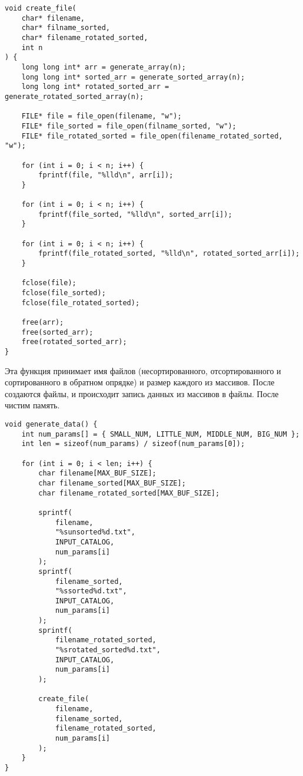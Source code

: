 \documentclass[a4paper,12pt,titlepage,finall]{article}
\begin{document}
\begin{verbatim}
void create_file(
    char* filename,
    char* filname_sorted,
    char* filename_rotated_sorted,
    int n
) {
    long long int* arr = generate_array(n);
    long long int* sorted_arr = generate_sorted_array(n);
    long long int* rotated_sorted_arr = generate_rotated_sorted_array(n);

    FILE* file = file_open(filename, "w");
    FILE* file_sorted = file_open(filname_sorted, "w");
    FILE* file_rotated_sorted = file_open(filename_rotated_sorted, "w");

    for (int i = 0; i < n; i++) {
        fprintf(file, "%lld\n", arr[i]);
    }

    for (int i = 0; i < n; i++) {
        fprintf(file_sorted, "%lld\n", sorted_arr[i]);
    }

    for (int i = 0; i < n; i++) {
        fprintf(file_rotated_sorted, "%lld\n", rotated_sorted_arr[i]);
    }

    fclose(file);
    fclose(file_sorted);
    fclose(file_rotated_sorted);

    free(arr);
    free(sorted_arr);
    free(rotated_sorted_arr);
}
\end{verbatim}

Эта функция принимает имя файлов (несортированного, отсортированного и сортированного в обратном опрядке) и размер каждого из массивов.
После создаются файлы, и происходит запись данных из массивов в файлы. После чистим память.

\begin{verbatim}
void generate_data() {
    int num_params[] = { SMALL_NUM, LITTLE_NUM, MIDDLE_NUM, BIG_NUM };
    int len = sizeof(num_params) / sizeof(num_params[0]);

    for (int i = 0; i < len; i++) {
        char filename[MAX_BUF_SIZE];
        char filename_sorted[MAX_BUF_SIZE];
        char filename_rotated_sorted[MAX_BUF_SIZE];

        sprintf(
            filename,
            "%sunsorted%d.txt",
            INPUT_CATALOG,
            num_params[i]
        );
        sprintf(
            filename_sorted,
            "%ssorted%d.txt",
            INPUT_CATALOG,
            num_params[i]
        );
        sprintf(
            filename_rotated_sorted,
            "%srotated_sorted%d.txt",
            INPUT_CATALOG,
            num_params[i]
        );

        create_file(
            filename,
            filename_sorted,
            filename_rotated_sorted,
            num_params[i]
        );
    }
}
\end{verbatim}
\end{document}
